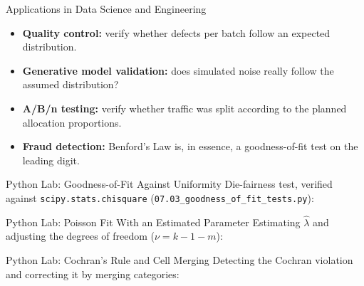 \documentclass[10pt, aspectratio=169]{beamer}
\begin{document}
\begin{frame}{Applications in Data Science and Engineering}
  \footnotesize
  \begin{itemize}\itemsep=0.1cm
    \item \textbf{Quality control:} verify whether defects per batch follow an expected distribution. \pause
    \item \textbf{Generative model validation:} does simulated noise really follow the assumed distribution? \pause
    \item \textbf{A/B/n testing:} verify whether traffic was split according to the planned allocation proportions. \pause
    \item \textbf{Fraud detection:} Benford's Law is, in essence, a goodness-of-fit test on the leading digit.
  \end{itemize}
\end{frame}

\begin{frame}[fragile]{Python Lab: Goodness-of-Fit Against Uniformity}
  \scriptsize
  Die-fairness test, verified against \texttt{scipy.stats.chisquare} (\texttt{07.03\_goodness\_of\_fit\_tests.py}):
  {
  }
\end{frame}

\begin{frame}[fragile]{Python Lab: Poisson Fit With an Estimated Parameter}
  \scriptsize
  Estimating $\hat\lambda$ and adjusting the degrees of freedom ($\nu=k-1-m$):
  {
  }
\end{frame}

\begin{frame}[fragile]{Python Lab: Cochran's Rule and Cell Merging}
  \scriptsize
  Detecting the Cochran violation and correcting it by merging categories:
  {
  }
\end{frame}
\end{document}
